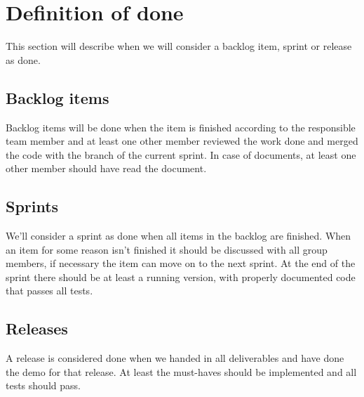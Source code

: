 \section{Definition of done}

This section will describe when we will consider a backlog item, sprint or release as done.
\subsection{Backlog items}
Backlog items will be done when the item is finished according to the responsible team member and at least one other member reviewed the work done and merged the code with the branch of the current sprint. In case of documents, at least one other member should have read the document.
\subsection{Sprints}
We’ll consider a sprint as done when all items in the backlog are finished. When an item for some reason isn’t finished it should be discussed with all group members, if necessary the item can move on to the next sprint. At the end of the sprint there should be at least a running version, with properly documented code that passes all tests.
\subsection{Releases}
 A release is considered done when we handed in all deliverables and have done the demo for that release. At least the must-haves should be implemented and all tests should pass.

